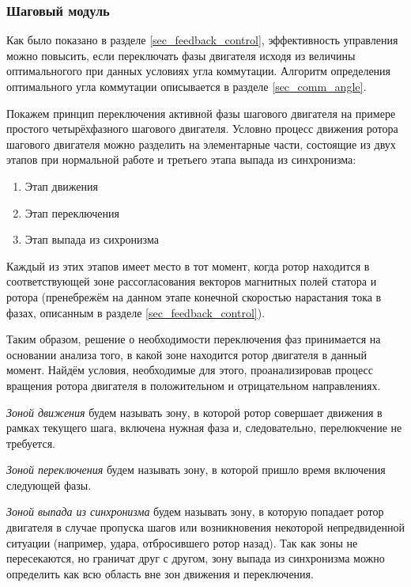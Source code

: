 \subsubsection{Шаговый модуль}

Как было показано в разделе \ref{sec_feedback_control}, эффективность управления
можно повысить, если переключать фазы двигателя исходя из величины оптимальногого
при данных условиях угла коммутации. Алгоритм определения оптимального угла
коммутации описывается в разделе \ref{sec_comm_angle}.

Покажем принцип переключения активной фазы шагового двигателя на примере простого
четырёхфазного шагового двигателя. Условно процесс движения ротора шагового двигателя
можно разделить на элементарные части, состоящие из двух этапов при нормальной
работе и третьего этапа выпада из синхронизма:

\begin{enumerate}
    \item Этап движения
    \item Этап переключения
    \item Этап выпада из сихронизма
\end{enumerate}

Каждый из этих этапов имеет место в тот момент, когда ротор находится в
соответствующей зоне рассогласования векторов магнитных полей статора и ротора
(пренебрежём на данном этапе конечной скоростью нарастания тока в фазах, описанным
в разделе \ref{sec_feedback_control}).

Таким образом, решение о необходимости переключения фаз принимается на основании
анализа того, в какой зоне находится ротор двигателя в данный момент. Найдём условия,
необходимые для этого, проанализировав процесс вращения ротора двигателя в
положительном и отрицательном направлениях.

\textit{Зоной движения} будем называть зону, в которой ротор совершает движения в рамках
текущего шага, включена нужная фаза и, следовательно, перелюкчение не требуется.

\textit{Зоной переключения} будем называть зону, в которой пришло время включения
следующей фазы.

\textit{Зоной выпада из синхронизма} будем называть зону, в которую попадает ротор
двигателя в случае пропуска шагов или возникновения некоторой непредвиденной ситуации
(например, удара, отбросившего ротор назад). Так как зоны не пересекаются, но граничат
друг с другом, зону выпада из синхронизма можно определить как всю область вне зон
движения и переключения.

